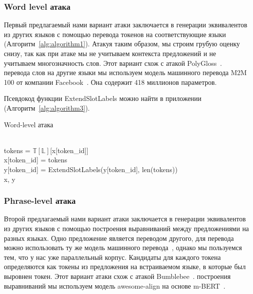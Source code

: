 \subsubsection{Word level атака}
Первый предлагаемый нами вариант атаки заключается в генерации эквивалентов из других языков с помощью перевода токенов на соответствующие языки (Алгоритм~\eqref{alg:algorithm1}).
Атакуя таким образом, мы строим грубую оценку снизу, так как при атаке мы не учитываем контекста предложений и не учитываем многозначность слов.
Этот вариант схож с атакой PolyGloss~\cite{Tan2021CodeMixingOS}.
 перевода слов на другие языки мы используем модель машинного перевода M2M 100 от компании Facebook~\cite{Fan2020BeyondEM}.
Она содержит 418 миллионов параметров.
\par Псевдокод функции ExtendSlotLabels можно найти в приложении (Алгоритм~\eqref{alg:algorithm3}).

\begin{algorithm}
    \caption{Word-level атака}
    \begin{algorithmic}
            \ind{}
                    \\
                    \ind\ind tokens = $\mathbb{T}[\mathbb{L}]$[x[token\_id]]\\
                    \ind\ind x[token\_id] = tokens\\
                    \ind\ind y[token\_id] = ExtendSlotLabels(y[token\_id], len(tokens))
            \EndIf \\
            \ind\Return x, y
        \EndFunction
    \end{algorithmic}\label{alg:algorithm1}
\end{algorithm}


\subsubsection{Phrase-level атака}
Второй предлагаемый нами вариант атаки заключается в генерации эквивалентов из других языков с помощью построения выравниваний между предложениями на разных языках.
Одно предложение является переводом другого, для перевода можно использовать ту же модель машинного перевода~\cite{Fan2020BeyondEM}, однако мы пользуемся тем, что у нас уже параллельный корпус.
Кандидаты для каждого токена определяются как токены из предложения на встраиваемом языке, в которые был выровнен токен.
Этот вариант атаки схож с атакой Bumblebee~\cite{Tan2021CodeMixingOS}.
 построения выравниваний мы используем модель awesome-align на основе m-BERT~\cite{Dou2021WordAB}.

